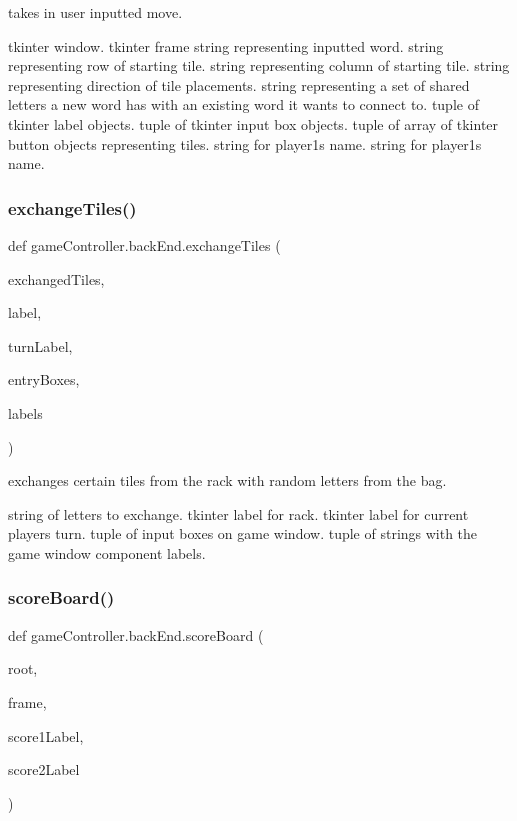takes in user inputted move. 

tkinter window.  tkinter frame  string representing inputted word.  string representing row of starting tile.  string representing column of starting tile.  string representing direction of tile placements.  string representing a set of shared letters a new word has with an existing word it wants to connect to.  tuple of tkinter label objects.  tuple of tkinter input box objects.  tuple of array of tkinter button objects representing tiles.  string for player1\textquotesingle{}s name.  string for player1\textquotesingle{}s name. \mbox{\label{classgame_controller_1_1back_end_ad12f14e8b6277e0a7166311d230480cd}} 
\subsubsection{\texorpdfstring{exchange\+Tiles()}{exchangeTiles()}}
{\footnotesize\ttfamily def game\+Controller.\+back\+End.\+exchange\+Tiles (\begin{DoxyParamCaption}\item[{}]{exchanged\+Tiles,  }\item[{}]{label,  }\item[{}]{turn\+Label,  }\item[{}]{entry\+Boxes,  }\item[{}]{labels }\end{DoxyParamCaption})}



exchanges certain tiles from the rack with random letters from the bag. 

string of letters to exchange.  tkinter label for rack.  tkinter label for current players turn.  tuple of input boxes on game window.  tuple of strings with the game window component labels. \mbox{\label{classgame_controller_1_1back_end_a5da56829420b20413e76aa7eb2857072}} 
\subsubsection{\texorpdfstring{score\+Board()}{scoreBoard()}}
{\footnotesize\ttfamily def game\+Controller.\+back\+End.\+score\+Board (\begin{DoxyParamCaption}\item[{}]{root,  }\item[{}]{frame,  }\item[{}]{score1\+Label,  }\item[{}]{score2\+Label }\end{DoxyParamCaption})}



